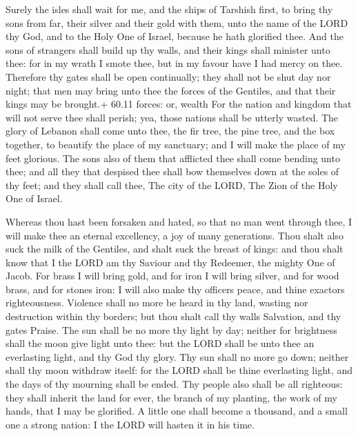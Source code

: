  Surely the isles shall wait for me, and the ships of
Tarshish first, to bring thy sons from far, their silver and their gold
with them, unto the name of the LORD thy God, and to the Holy One of
Israel, because he hath glorified thee.  And the sons of
strangers shall build up thy walls, and their kings shall minister unto
thee: for in my wrath I smote thee, but in my favour have I had mercy on
thee.  Therefore thy gates shall be open continually; they
shall not be shut day nor night; that men may bring unto thee the forces
of the Gentiles, and that their kings may be brought.+ 60.11 forces: or,
wealth  For the nation and kingdom that will not serve thee
shall perish; yea, those nations shall be utterly wasted. 
The glory of Lebanon shall come unto thee, the fir tree, the pine tree,
and the box together, to beautify the place of my sanctuary; and I will
make the place of my feet glorious.  The sons also of them
that afflicted thee shall come bending unto thee; and all they that
despised thee shall bow themselves down at the soles of thy feet; and
they shall call thee, The city of the LORD, The Zion of the Holy One of
Israel.

 Whereas thou hast been forsaken and hated, so that no man
went through thee, I will make thee an eternal excellency, a joy of many
generations.  Thou shalt also suck the milk of the
Gentiles, and shalt suck the breast of kings: and thou shalt know that I
the LORD am thy Saviour and thy Redeemer, the mighty One of Jacob.
 For brass I will bring gold, and for iron I will bring
silver, and for wood brass, and for stones iron: I will also make thy
officers peace, and thine exactors righteousness.  Violence
shall no more be heard in thy land, wasting nor destruction within thy
borders; but thou shalt call thy walls Salvation, and thy gates Praise.
 The sun shall be no more thy light by day; neither for
brightness shall the moon give light unto thee: but the LORD shall be
unto thee an everlasting light, and thy God thy glory.  Thy
sun shall no more go down; neither shall thy moon withdraw itself: for
the LORD shall be thine everlasting light, and the days of thy mourning
shall be ended.  Thy people also shall be all righteous:
they shall inherit the land for ever, the branch of my planting, the
work of my hands, that I may be glorified.  A little one
shall become a thousand, and a small one a strong nation: I the LORD
will hasten it in his time.

